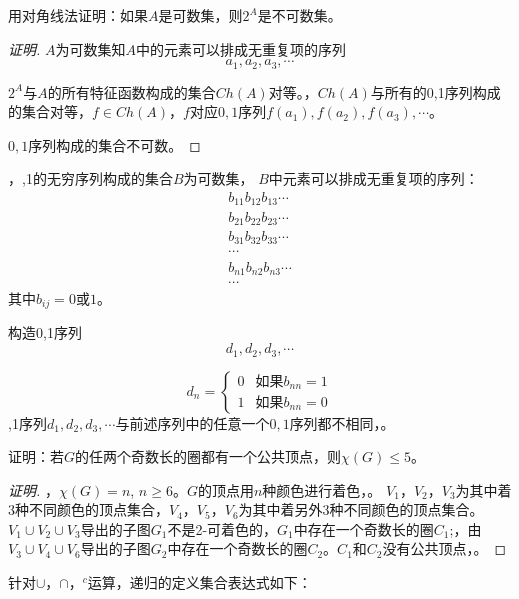\documentclass{beamer}
\begin{document}
\begin{CJK*}{UTF8}{gbsn}
\begin{frame}
  \begin{Exercise}
    用对角线法证明：如果$A$是可数集，则$2^A$是不可数集。
  \end{Exercise}\pause
  \begin{proof}[证明]\justifying\let\raggedright\justifying
    $A$为可数集知$A$中的元素可以排成无重复项的序列
   \pause \[a_1,a_2,a_3,\cdots\]

    \pause$2^A$与$A$的所有特征函数构成的集合$Ch(A)$对等。，\pause$Ch(A)$与所有的0,1序列构成的集合对等，$f\in Ch(A)$，\pause$f$对应$0,1$序列$f(a_1),f(a_2),f(a_3),\cdots$。
    
    $0,1$序列构成的集合不可数。
  \end{proof}  
\end{frame}
\begin{frame}\justifying\let\raggedright\justifying
  ，,1的无穷序列构成的集合$B$为可数集，
  $B$中元素可以排成无重复项的序列：
  \pause\begin{align*}
    b_{11}b_{12}b_{13}\cdots\\
    b_{21}b_{22}b_{23}\cdots\\
    b_{31}b_{32}b_{33}\cdots\\
    \cdots\\
    b_{n1}b_{n2}b_{n3}\cdots\\
    \cdots
  \end{align*}
 \pause 其中$b_{ij}=0$或$1$。
  
 \pause 构造0,1序列
\pause\[d_1,d_2,d_3,\cdots\]

\[d_n=
\begin{cases}
  0&\text{如果}b_{nn}=1\\
  1&\text{如果}b_{nn}=0
\end{cases}\]
,1序列$d_1,d_2,d_3,\cdots$与前述序列中的任意一个$0,1$序列都不相同，。
\end{frame}
\begin{frame}
  \begin{Exercise}
    证明：若$G$的任两个奇数长的圈都有一个公共顶点，则$\chi(G)\leq 5$。
  \end{Exercise}
  \pause\begin{proof}[证明]\justifying\let\raggedright\justifying
  ，$\chi(G)=n$, $n \geq 6$。$G$的顶点用$n$种颜色进行着色，。
  $V_1$，$V_2$，$V_3$为其中着3种不同颜色的顶点集合，\pause$V_4$，$V_5$，$V_6$为其中着另外3种不同颜色的顶点集合。$V_1\cup V_2\cup V_3$导出的子图$G_1$不是2-可着色的，$G_1$中存在一个奇数长的圈$C_1$;，由$V_3\cup V_4\cup V_6$导出的子图$G_2$中存在一个奇数长的圈$C_2$。\pause$C_1$和$C_2$没有公共顶点，。
\end{proof}
\end{frame}
\begin{frame}
  \begin{Def1}
    针对$\cup$，$\cap$，$^c$运算，递归的定义集合表达式如下：


\end{Def1}
\end{frame}
\end{CJK*}
\end{document}
